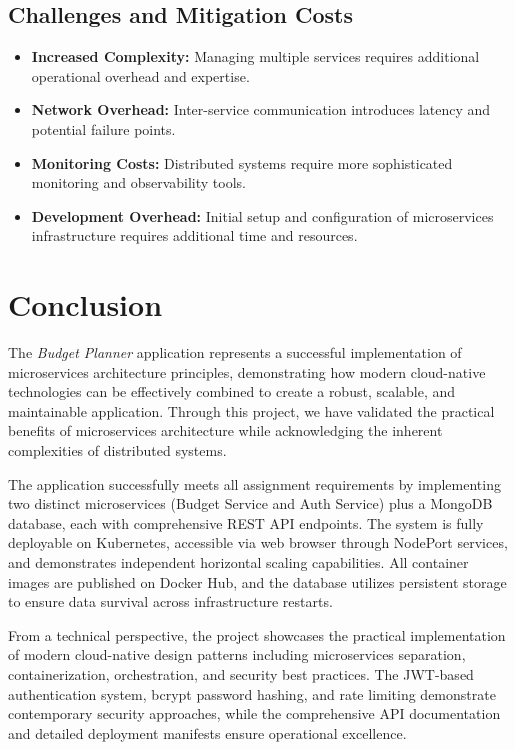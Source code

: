 \documentclass[conference]{IEEEtran}
\begin{document}
\subsection{Challenges and Mitigation Costs}
\begin{itemize}
  \item \textbf{Increased Complexity:} Managing multiple services requires additional operational overhead and expertise.
  \item \textbf{Network Overhead:} Inter-service communication introduces latency and potential failure points.
  \item \textbf{Monitoring Costs:} Distributed systems require more sophisticated monitoring and observability tools.
  \item \textbf{Development Overhead:} Initial setup and configuration of microservices infrastructure requires additional time and resources.
\end{itemize}

\section{\textbf{Conclusion}}
The \emph{Budget Planner} application represents a successful implementation of microservices architecture principles, demonstrating how modern cloud-native technologies can be effectively combined to create a robust, scalable, and maintainable application. Through this project, we have validated the practical benefits of microservices architecture while acknowledging the inherent complexities of distributed systems.

The application successfully meets all assignment requirements by implementing two distinct microservices (Budget Service and Auth Service) plus a MongoDB database, each with comprehensive REST API endpoints. The system is fully deployable on Kubernetes, accessible via web browser through NodePort services, and demonstrates independent horizontal scaling capabilities. All container images are published on Docker Hub, and the database utilizes persistent storage to ensure data survival across infrastructure restarts.

From a technical perspective, the project showcases the practical implementation of modern cloud-native design patterns including microservices separation, containerization, orchestration, and security best practices. The JWT-based authentication system, bcrypt password hashing, and rate limiting demonstrate contemporary security approaches, while the comprehensive API documentation and detailed deployment manifests ensure operational excellence.
\end{document}
